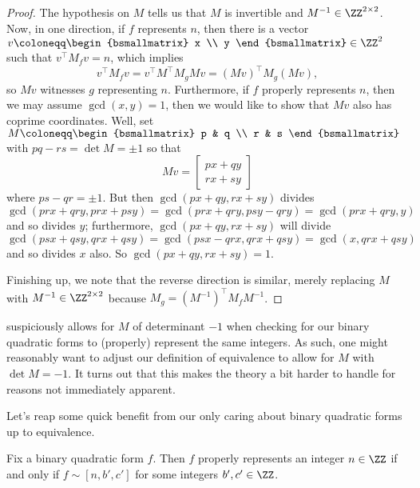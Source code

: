 \documentclass[../notes.tex]{subfiles}
\begin{document}
\begin{proof}
	The hypothesis on $M$ tells us that $M$ is invertible and $M^{-1}\in\ZZ^{2\times2}$. Now, in one direction, if $f$ represents $n$, then there is a vector $v\coloneqq\begin{bsmallmatrix}
		x \\ y
	\end{bsmallmatrix}\in\ZZ^2$ such that $v^\intercal M_fv=n$, which implies
	\[v^\intercal M_fv=v^\intercal M^\intercal M_gMv=(Mv)^\intercal M_g(Mv),\]
	so $Mv$ witnesses $g$ representing $n$. Furthermore, if $f$ properly represents $n$, then we may assume $\gcd(x,y)=1$, then we would like to show that $Mv$ also has coprime coordinates. Well, set $M\coloneqq\begin{bsmallmatrix}
		p & q \\ r & s
	\end{bsmallmatrix}$ with $pq-rs=\det M=\pm1$ so that
	\[Mv=\begin{bmatrix}
		px+qy \\
		rx+sy
	\end{bmatrix}\]
	where $ps-qr=\pm1$. But then $\gcd(px+qy,rx+sy)$ divides $\gcd(prx+qry,prx+psy)=\gcd(prx+qry,psy-qry)=\gcd(prx+qry,y)$ and so divides $y$; furthermore, $\gcd(px+qy,rx+sy)$ will divide $\gcd(psx+qsy,qrx+qsy)=\gcd(psx-qrx,qrx+qsy)=\gcd(x,qrx+qsy)$ and so divides $x$ also. So $\gcd(px+qy,rx+sy)=1$.
	
	Finishing up, we note that the reverse direction is similar, merely replacing $M$ with $M^{-1}\in\ZZ^{2\times2}$ because $M_g=\left(M^{-1}\right)^\intercal M_fM^{-1}$.
\end{proof}
\begin{remark}
	 suspiciously allows for $M$ of determinant $-1$ when checking for our binary quadratic forms to (properly) represent the same integers. As such, one might reasonably want to adjust our definition of equivalence to allow for $M$ with $\det M=-1$. It turns out that this makes the theory a bit harder to handle for reasons not immediately apparent.
\end{remark}
Let's reap some quick benefit from our only caring about binary quadratic forms up to equivalence.
\begin{proposition} \label{prop:proper-rep-by-equiv}
	Fix a binary quadratic form $f$. Then $f$ properly represents an integer $n\in\ZZ$ if and only if $f\sim[n,b',c']$ for some integers $b',c'\in\ZZ$.
\end{proposition}
\end{document}
